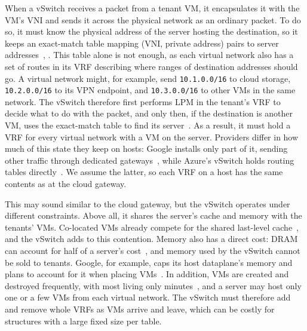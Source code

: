 \documentclass[11pt,a4paper,oneside]{report}
\newcommand{\pfx}[1]{\texttt{#1}}
\begin{document}
When a vSwitch receives a packet from a tenant VM, it encapsulates it with the
VM's VNI and sends it across the physical network as an ordinary packet. To do
so, it must know the physical address of the server hosting the destination, so
it keeps an exact-match table mapping (VNI, private address) pairs to server
addresses~\cite{firestone2017vfp}, \cite{pan2021sailfish}. This table alone is
not enough, as each virtual network also has a set of routes in its VRF
describing where ranges of destination addresses should go. A virtual network
might, for example, send \pfx{10.1.0.0/16} to cloud storage, \pfx{10.2.0.0/16}
to its VPN endpoint, and \pfx{10.3.0.0/16} to other VMs in the same network. The
vSwitch therefore first performs LPM in the tenant's VRF to decide what to do
with the packet, and only then, if the destination is another VM, uses the
exact-match table to find its server~\cite{firestone2017vfp}. As a result, it
must hold a VRF for every virtual network with a VM on the server. Providers
differ in how much of this state they keep on hosts: Google installs only part
of it, sending other traffic through dedicated
gateways~\cite{dalton2018andromeda}, while Azure's vSwitch holds routing tables
directly~\cite{firestone2017vfp}. We assume the latter, so each VRF on a host
has the same contents as at the cloud gateway.

This may sound similar to the cloud gateway, but the vSwitch operates under
different constraints. Above all, it shares the server's cache and memory with
the tenants' VMs. Co-located VMs already compete for the shared last-level
cache~\cite{hu2026cacheman}, and the vSwitch adds to this contention. Memory also
has a direct cost: DRAM can account for half of a server's
cost~\cite{li2023pond}, and memory used by the vSwitch cannot be sold to
tenants. Google, for example, caps its host dataplane's memory and plans to
account for it when placing VMs~\cite{dalton2018andromeda}. In addition, VMs are
created and destroyed frequently, with most living only
minutes~\cite{hadary2020protean}, and a server may host only one or a few VMs
from each virtual network. The vSwitch must therefore add and remove whole VRFs
as VMs arrive and leave, which can be costly for structures with a large fixed
size per table.
\end{document}
